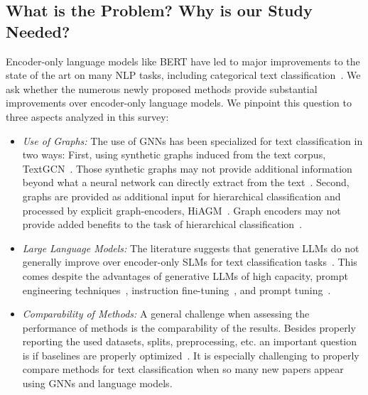 \documentclass[lettersize,journal]{IEEEtran}
\newcommand{\SLMs}{SLMs\xspace}
\newcommand{\LLMs}{LLMs\xspace}
\begin{document}
\subsection{What is the Problem? Why is our Study Needed?}
\label{sec:questions}

Encoder-only language models like BERT have led to major improvements to the state of the art on many NLP tasks, including categorical text classification~\cite{galkescherp-acl2022}.
We ask whether the numerous newly proposed methods provide substantial improvements over encoder-only language models. 
We pinpoint this question to three aspects analyzed in this survey:

\begin{itemize}
    \item 
    \textit{Use of Graphs:}
The use of GNNs has been specialized for text classification in two ways: First, using synthetic graphs induced from the text corpus, \eg TextGCN~\cite{DBLP:conf/aaai/YaoM019}.
Those synthetic graphs may not provide additional information beyond what a neural network can directly extract from the text~\cite{galkescherp-acl2022}.
Second, graphs are provided as additional input for hierarchical classification and processed by explicit graph-encoders, \eg HiAGM~\cite{hiagm}.
Graph encoders may not provide added benefits to the task of hierarchical classification~\cite{hydra,radar}.

\item \textit{Large Language Models:}
The literature suggests that generative \LLMs do not generally improve over encoder-only \SLMs for text classification tasks~\cite{DBLP:conf/emnlp/PecherSB25-100-samples,
pushing-the-limit-11346014-rgpt,
carp,
yuan2023revisiting,
li2023chatgpt,
yu2023open}.
This comes despite the advantages of generative \LLMs of high capacity, prompt engineering techniques~\cite{carp,chain-of-thought}, 
instruction fine-tuning~\cite{wei2022finetuned}, and prompt tuning~\cite{liu-etal-2022-p,lester-etal-2021-power}.

\item \textit{Comparability of Methods:}
A general challenge when assessing the performance of methods is the comparability of the results.
Besides properly reporting the used datasets, splits, preprocessing, etc. an important question is if baselines are properly optimized~\cite{DBLP:conf/recsys/DacremaCJ19,leech2024questionablepracticesmachinelearning}. 
It is especially challenging to properly compare methods for text classification when so many new papers appear using GNNs and language models.
\end{itemize}
\end{document}
